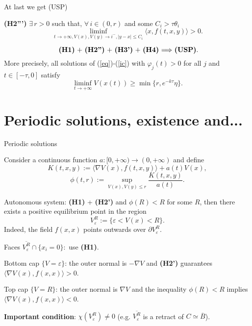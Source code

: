 \documentclass[spanish]{beamer}
\def \le{\leqslant}
\def \ge{\geqslant}
\begin{document}
\begin{frame}{ At last we get (USP)}

{\bf (H2''')} $\exists \, r>0$ such that, $\forall \, i\in (0,r)$ and some $C_i>\tau \theta_i$ 
$$\liminf_{t\to+\infty, V(x),V(y)\to i^-, |y-x|\le C_i }\langle x,f(t,x,y)\rangle  > 0.
$$

\begin{theorem}

$$\hbox{ {\bf (H1)} $+$ 
{\bf (H2'')}
$+$ 
{\bf (H3')}
$+$ 
{\bf (H4)}
$\Longrightarrow$ {\bf (USP)}.}$$ 
More precisely, all solutions of (\ref{eq})-(\ref{ic}) with $\varphi_j(t)>0$ for all $j$ and $t\in [-\tau,0]$ satisfy 
$$\liminf_{t\to+\infty} V(x(t))\ge \min\{ r, e^{-k\tau}\eta \}.$$
\end{theorem}

\end{frame}

\section{Periodic solutions, existence and...}


\begin{frame}{Periodic solutions}
    
Consider a continuous function $a:[0,+\infty)\to (0,+\infty)$ and define
$$K(t,x,y):= 
\langle \nabla V(x),f(t,x,y)\rangle + a(t)V(x),
$$
$$\phi(t,r):= 
 \sup_{V(x),V(y)\le r} {\frac {K(t,x,y)}{a(t)}}.
$$

\medskip 

Autonomous system:  
{\bf (H1)} + 
{\bf (H2')}  and  
 $\phi(R)<R$ for some $R$, then there exists a positive equilibrium point in the region  
$$
V_\varepsilon^R:=\{ \varepsilon < V(x) < R\}.
$$
Indeed, the field $f(x,x)$ points outwards over $\partial V_\varepsilon^R$.


\end{frame}

\begin{frame}{
}

Faces $\overline{V_\varepsilon^R}\cap \{ 
x_i = 0\}:$ use {\bf (H1)}. 
\bigskip

Bottom cap $\{V=\varepsilon\}$: the outer normal is $-\nabla V$ and
{\bf (H2')} guarantees $\langle \nabla V(x),f(x,x)\rangle>0$.

\bigskip

Top cap $\{V=R\}$: the outer normal is $\nabla V$ and
the inequality  $\phi(R)<R$ implies 
$\langle \nabla V(x),f(x,x)\rangle <0$. 
 
\bigskip
\pause 

{\bf Important condition}: $\chi(V_\varepsilon^R)\ne 0$ (e.g. $\overline{V_\varepsilon^R}$
is a retract of $C\simeq \overline B$). 
    
\end{frame}
\end{document}
